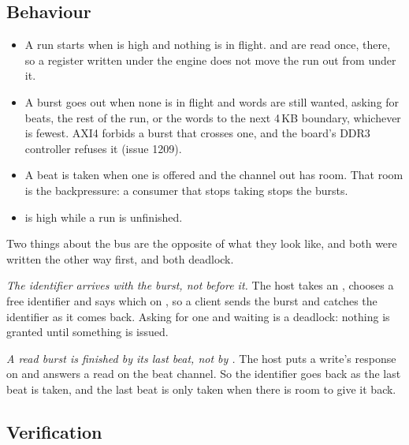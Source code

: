 
\subsection*{Behaviour}

\begin{itemize}
\item A run starts when  is high and nothing is in flight.
 and  are read once, there, so a register
written under the engine does not move the run out from under it.
\item A burst goes out when none is in flight and words are still
wanted, asking for  beats, the rest of the run, or the
words to the next 4\,KB boundary, whichever is fewest. AXI4 forbids a
burst that crosses one, and the board's DDR3 controller refuses it
(issue 1209).
\item A beat is taken when one is offered and the channel out has
room. That room is the backpressure: a consumer that stops taking
stops the bursts.
\item {} is high while a run is unfinished.
\end{itemize}

Two things about the bus are the opposite of what they look like, and
both were written the other way first, and both deadlock.

\emph{The identifier arrives with the burst, not before it.} The host
takes an , chooses a free identifier and says which on
, so a client sends the burst and catches the identifier
as it comes back. Asking for one and waiting is a deadlock: nothing
is granted until something is issued.

\emph{A read burst is finished by its last beat, not by .}
The host puts a write's response on  and answers a read on
the beat channel. So the identifier goes back as the last beat is
taken, and the last beat is only taken when there is room to give it
back.

\subsection*{Verification}

